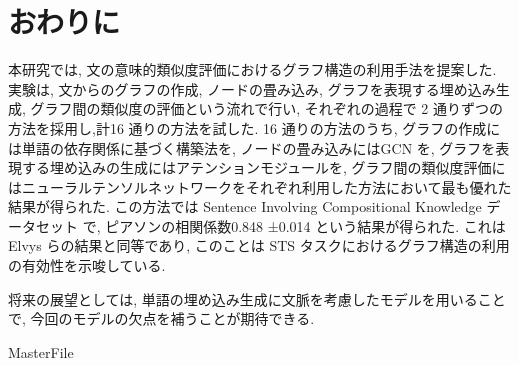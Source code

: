 \documentclass[a4j,twoside,12pt]{thesis} %
\begin{document}
\addtocounter{chapter}{+5}

\setlength{\baselineskip}{1.95zw}
\setlength{\textheight}{30\baselineskip}

\fi


\chapter{おわりに}\label{conc}
本研究では, 文の意味的類似度評価におけるグラフ構造の利用手法を提案した.
実験は, 文からのグラフの作成, ノードの畳み込み, グラフを表現する埋め込み生成, グラフ間の類似度の評価という流れで行い, それぞれの過程で 2 通りずつの方法を採用し,計16 通りの方法を試した.
16 通りの方法のうち, グラフの作成には単語の依存関係に基づく構築法を, ノードの畳み込みにはGCN を, グラフを表現する埋め込みの生成にはアテンションモジュールを, グラフ間の類似度評価にはニューラルテンソルネットワークをそれぞれ利用した方法において最も優れた結果が得られた. この方法では Sentence Involving Compositional Knowledge データセット で, ピアソンの相関係数0.848 ±0.014 という結果が得られた.
これは Elvys らの結果と同等であり, このことは STS タスクにおけるグラフ構造の利用の有効性を示唆している.
\par 将来の展望としては, 単語の埋め込み生成に文脈を考慮したモデルを用いることで, 今回のモデルの欠点を補うことが期待できる.

\expandafter\ifx\csname MasterFile\endcsname\relax
\def\MasterFile{本原稿です}

% 



\end{document}
